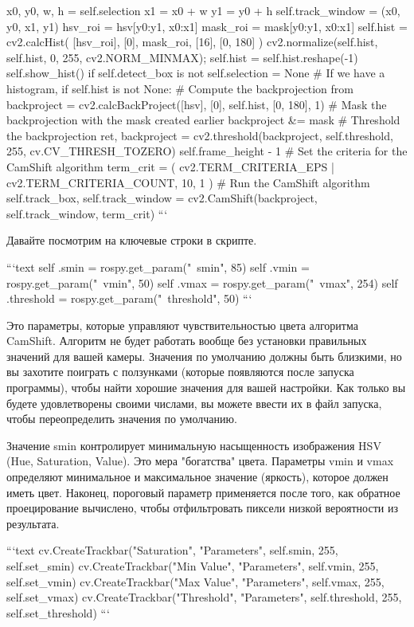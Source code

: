 {x0, y0, w, h = self.selection
x1 = x0 + w
y1 = y0 + h
self.track_window = (x0, y0, x1, y1)
hsv_roi = hsv[y0:y1, x0:x1]
mask_roi = mask[y0:y1, x0:x1]
self.hist = cv2.calcHist( [hsv_roi], [0], mask_roi, [16], [0,
180] )
cv2.normalize(self.hist, self.hist, 0, 255, cv2.NORM_MINMAX);
self.hist = self.hist.reshape(-1)
self.show_hist()
if self.detect_box is not
self.selection = None
# If we have a histogram,
if self.hist is not None:
# Compute the backprojection from
backproject = cv2.calcBackProject([hsv], [0], self.hist, [0,
180], 1) 
# Mask the backprojection with the mask created earlier
backproject &= mask
# Threshold the backprojection
ret, backproject = cv2.threshold(backproject, self.threshold,
255, cv.CV_THRESH_TOZERO) 
self.frame_height - 1
# Set the criteria for the CamShift algorithm
term_crit = ( cv2.TERM_CRITERIA_EPS | cv2.TERM_CRITERIA_COUNT,
10, 1 ) 
# Run the CamShift algorithm
self.track_box, self.track_window = cv2.CamShift(backproject,
self.track_window, term_crit)
```

Давайте посмотрим на ключевые строки в скрипте.

```text
self .smin = rospy.get_param("~smin", 85)
self .vmin = rospy.get_param("~vmin", 50)
self .vmax = rospy.get_param("~vmax", 254)
self .threshold = rospy.get_param("~threshold", 50)
```

Это параметры, которые управляют чувствительностью цвета алгоритма CamShift. Алгоритм не будет работать вообще без установки правильных значений для вашей камеры. Значения по умолчанию должны быть близкими, но вы захотите поиграть с ползунками (которые появляются после запуска программы), чтобы найти хорошие значения для вашей настройки. Как только вы будете удовлетворены своими числами, вы можете ввести их в файл запуска, чтобы переопределить значения по умолчанию.

Значение smin контролирует минимальную насыщенность изображения HSV (Hue, Saturation, Value). Это мера "богатства" цвета. Параметры vmin и vmax определяют минимальное и максимальное значение (яркость), которое должен иметь цвет. Наконец, пороговый параметр применяется после того, как обратное проецирование вычислено, чтобы отфильтровать пиксели низкой вероятности из результата.

```text
cv.CreateTrackbar("Saturation", "Parameters", self.smin, 255, self.set_smin)
cv.CreateTrackbar("Min Value", "Parameters", self.vmin, 255, self.set_vmin)
cv.CreateTrackbar("Max Value", "Parameters", self.vmax, 255, self.set_vmax)
cv.CreateTrackbar("Threshold", "Parameters", self.threshold, 255, self.set_threshold)
```

}
